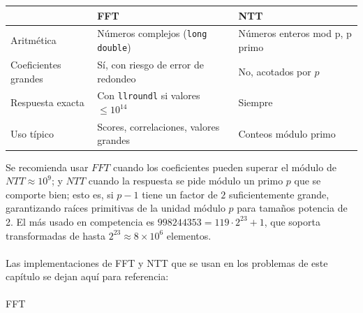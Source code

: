 \begin{table}[H]
\centering
\renewcommand{\arraystretch}{1.4}
\begin{tabular}{lll}
\toprule
 & \textbf{FFT} & \textbf{NTT} \\
\midrule
Aritmética        & Números complejos (\texttt{long double}) & Números enteros mod p, p primo \\
Coeficientes grandes & Sí, con riesgo de error de redondeo & No, acotados por $p$ \\
Respuesta exacta  & Con \texttt{llroundl} si valores $\leq 10^{14}$ & Siempre \\
Uso típico        & Scores, correlaciones, valores grandes & Conteos módulo primo \\
\bottomrule
\end{tabular}
\end{table}
Se recomienda usar $FFT$ cuando los coeficientes pueden superar el módulo de $NTT \approx 10^9$; y $NTT$ cuando la respuesta se pide módulo un primo $p$ que se comporte bien; esto es, si $p-1$ tiene un factor de $2$ suficientemente grande, garantizando raíces primitivas de la unidad módulo $p$ para tamaños potencia de 2. El más usado en competencia es $998244353 = 119 \cdot 2^{23} + 1$, que soporta transformadas de hasta $2^{23} \approx 8 \times 10^6$ elementos.
\\\\
Las implementaciones de FFT y NTT que se usan en los problemas de este capítulo se dejan aquí para referencia:
\\\\FFT
